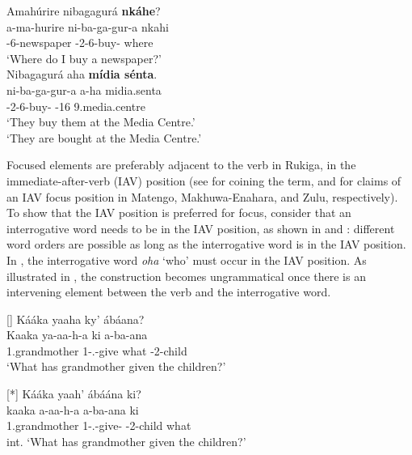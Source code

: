 \documentclass[output=paper]{langscibook}
\begin{document}
\z
\z


\ea
\label{bkm:Ref113441670}
\ea
Amahúrire nibagagurá \textbf{nkáhe}?\\
\gll
a-ma-hurire  ni-ba-ga-gur-a  nkahi\\
\AUG{}-6-newspaper  \IPFV{}-2\SM{}-6\OM{}-buy-\FV{}  where\\
\glt
‘Where do I buy a newspaper?’\\


\ex
Nibagagurá aha \textbf{mídia sénta}.\\
\gll
ni-ba-ga-gur-a  a-ha  midia.senta\\
\IPFV{}-2\SM{}-6\OM{}-buy-\FV{}  \AUG{}-16  9.media.centre\\
\glt
‘They buy them at the Media Centre.’\\
‘They are bought at the Media Centre.’


\z
\z

Focused elements are preferably adjacent to the verb in Rukiga, in the immediate-after-verb (IAV) position (see \citealt{Watters1979} for coining the term, and \citealt{Yoneda2011,vanderWal2009a,Buell2009} for claims of an IAV focus position in Matengo, Makhuwa-Enahara, and Zulu, respectively). To show that the IAV position is preferred for focus, consider that an interrogative word needs to be in the IAV position, as shown in  and : different word orders are possible as long as the interrogative word is in the IAV position. In , the interrogative word \textit{oha} ‘who’ must occur in the IAV position. As illustrated in , the construction becomes ungrammatical once there is an intervening element between the verb and the interrogative word.

\ea
\label{bkm:Ref111453770}
\ea
[]{
Kááka yaaha ky’ ábáana?\\
\gll
Kaaka  ya-aa-h-a  ki  a-ba-ana\\
1.grandmother  1\SM{}-\N{}.\PST{}-give  what  \AUG{}-2-child \\
\glt
‘What has grandmother given the children?’\\
}

\ex
[*]{
Kááka yaah’ ábáána ki?\\
\gll
kaaka  a-aa-h-a  a-ba-ana  ki\\
1.grandmother  1\SM{}-\N{}.\PST{}-give-\FV{}  \AUG{}-2-child  what\\
\glt
int. ‘What has grandmother given the children?’\\
}
\end{document}
